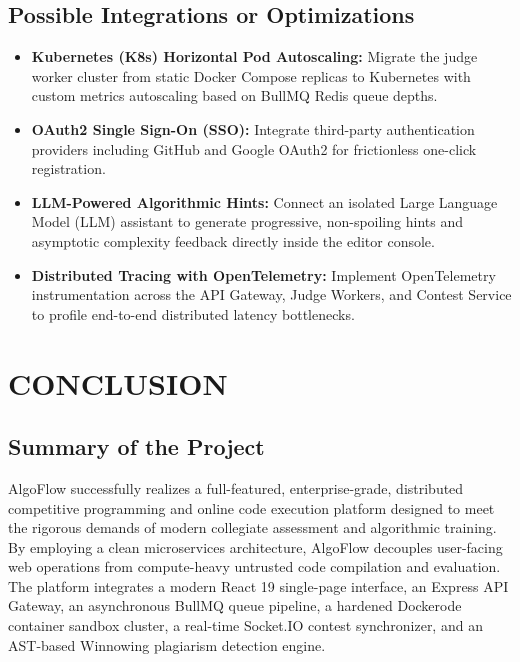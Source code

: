 \documentclass[12pt,a4paper]{report}
\begin{document}
\section{Possible Integrations or Optimizations}
\begin{itemize}[leftmargin=*]
  \item \textbf{Kubernetes (K8s) Horizontal Pod Autoscaling:} Migrate the judge worker cluster from static Docker Compose replicas to Kubernetes with custom metrics autoscaling based on BullMQ Redis queue depths.
  \item \textbf{OAuth2 Single Sign-On (SSO):} Integrate third-party authentication providers including GitHub and Google OAuth2 for frictionless one-click registration.
  \item \textbf{LLM-Powered Algorithmic Hints:} Connect an isolated Large Language Model (LLM) assistant to generate progressive, non-spoiling hints and asymptotic complexity feedback directly inside the editor console.
  \item \textbf{Distributed Tracing with OpenTelemetry:} Implement OpenTelemetry instrumentation across the API Gateway, Judge Workers, and Contest Service to profile end-to-end distributed latency bottlenecks.
\end{itemize}

\clearpage

\chapter{CONCLUSION}

\section{Summary of the Project}
AlgoFlow successfully realizes a full-featured, enterprise-grade, distributed competitive programming and online code execution platform designed to meet the rigorous demands of modern collegiate assessment and algorithmic training. By employing a clean microservices architecture, AlgoFlow decouples user-facing web operations from compute-heavy untrusted code compilation and evaluation. The platform integrates a modern React 19 single-page interface, an Express API Gateway, an asynchronous BullMQ queue pipeline, a hardened Dockerode container sandbox cluster, a real-time Socket.IO contest synchronizer, and an AST-based Winnowing plagiarism detection engine.
\end{document}
